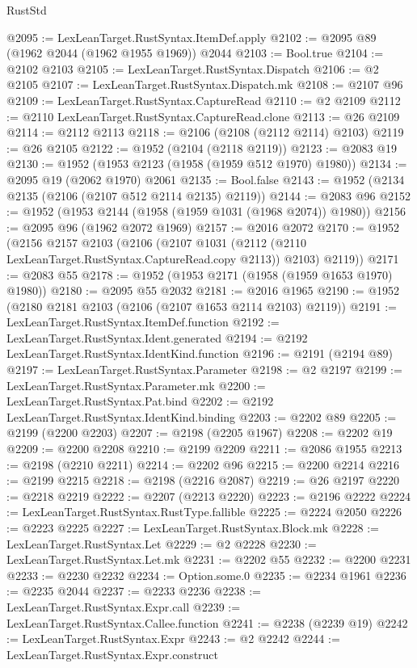\begin{lexlean}{RustStd}
\begin{coremodule}
{\begin{coremodule}
{{{{{{{{{{{{{{{{{{{{{{{{{{{{{{{{{{@2095 := LexLeanTarget.RustSyntax.ItemDef.apply
@2102 := @2095 @89 (@1962 @2044 (@1962 @1955 @1969)) @2044
@2103 := Bool.true
@2104 := @2102 @2103
@2105 := LexLeanTarget.RustSyntax.Dispatch
@2106 := @2 @2105
@2107 := LexLeanTarget.RustSyntax.Dispatch.mk
@2108 := @2107 @96
@2109 := LexLeanTarget.RustSyntax.CaptureRead
@2110 := @2 @2109
@2112 := @2110 LexLeanTarget.RustSyntax.CaptureRead.clone
@2113 := @26 @2109
@2114 := @2112 @2113
@2118 := @2106 (@2108 (@2112 @2114) @2103)
@2119 := @26 @2105
@2122 := @1952 (@2104 (@2118 @2119))
@2123 := @2083 @19
@2130 := @1952 (@1953 @2123 (@1958 (@1959 @512 @1970) @1980))
@2134 := @2095 @19 (@2062 @1970) @2061
@2135 := Bool.false
@2143 := @1952 (@2134 @2135 (@2106 (@2107 @512 @2114 @2135) @2119))
@2144 := @2083 @96
@2152 := @1952 (@1953 @2144 (@1958 (@1959 @1031 (@1968 @2074)) @1980))
@2156 := @2095 @96 (@1962 @2072 @1969)
@2157 := @2016 @2072
@2170 := @1952
    (@2156
      @2157
      @2103
      (@2106
        (@2107 @1031 (@2112 (@2110 LexLeanTarget.RustSyntax.CaptureRead.copy @2113)) @2103)
        @2119))
@2171 := @2083 @55
@2178 := @1952 (@1953 @2171 (@1958 (@1959 @1653 @1970) @1980))
@2180 := @2095 @55 @2032
@2181 := @2016 @1965
@2190 := @1952 (@2180 @2181 @2103 (@2106 (@2107 @1653 @2114 @2103) @2119))
@2191 := LexLeanTarget.RustSyntax.ItemDef.function
@2192 := LexLeanTarget.RustSyntax.Ident.generated
@2194 := @2192 LexLeanTarget.RustSyntax.IdentKind.function
@2196 := @2191 (@2194 @89)
@2197 := LexLeanTarget.RustSyntax.Parameter
@2198 := @2 @2197
@2199 := LexLeanTarget.RustSyntax.Parameter.mk
@2200 := LexLeanTarget.RustSyntax.Pat.bind
@2202 := @2192 LexLeanTarget.RustSyntax.IdentKind.binding
@2203 := @2202 @89
@2205 := @2199 (@2200 @2203)
@2207 := @2198 (@2205 @1967)
@2208 := @2202 @19
@2209 := @2200 @2208
@2210 := @2199 @2209
@2211 := @2086 @1955
@2213 := @2198 (@2210 @2211)
@2214 := @2202 @96
@2215 := @2200 @2214
@2216 := @2199 @2215
@2218 := @2198 (@2216 @2087)
@2219 := @26 @2197
@2220 := @2218 @2219
@2222 := @2207 (@2213 @2220)
@2223 := @2196 @2222
@2224 := LexLeanTarget.RustSyntax.RustType.fallible
@2225 := @2224 @2050
@2226 := @2223 @2225
@2227 := LexLeanTarget.RustSyntax.Block.mk
@2228 := LexLeanTarget.RustSyntax.Let
@2229 := @2 @2228
@2230 := LexLeanTarget.RustSyntax.Let.mk
@2231 := @2202 @55
@2232 := @2200 @2231
@2233 := @2230 @2232
@2234 := Option.some.{0}
@2235 := @2234 @1961
@2236 := @2235 @2044
@2237 := @2233 @2236
@2238 := LexLeanTarget.RustSyntax.Expr.call
@2239 := LexLeanTarget.RustSyntax.Callee.function
@2241 := @2238 (@2239 @19)
@2242 := LexLeanTarget.RustSyntax.Expr
@2243 := @2 @2242
@2244 := LexLeanTarget.RustSyntax.Expr.construct
}}}}}}}}}}}}}}}}}}}}}}}}}}}}}}}}}}
\end{coremodule}}
\end{coremodule}
\end{lexlean}
